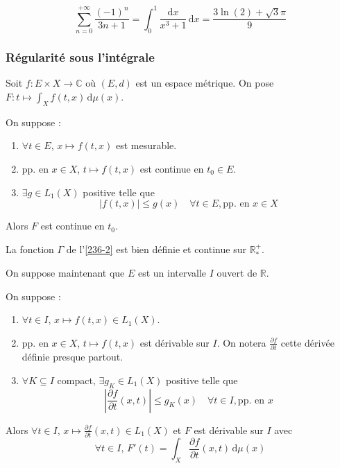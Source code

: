 
  \begin{example}
    \[ \sum_{n=0}^{+\infty} \frac{(-1)^n}{3n+1} = \int_0^1 \frac{\mathrm{d}x}{x^3 + 1} \, \mathrm{d}x = \frac{3\ln(2) + \sqrt{3}\pi}{9} \]
  \end{example}

  \subsubsection{Régularité sous l'intégrale}


  Soit $f : E \times X \rightarrow \mathbb{C}$ où $(E, d)$ est un espace métrique. On pose $F : t \mapsto \int_X f(t, x) \, \mathrm{d}\mu(x)$.

  \begin{theorem}
    On suppose :
    \begin{enumerate}[label=(\roman*)]
      \item $\forall t \in E$, $x \mapsto f(t,x)$ est mesurable.
      \item pp. en $x \in X$, $t \mapsto f(t,x)$ est continue en $t_0 \in E$.
      \item $\exists g \in L_1(X)$ positive telle que
      \[ |f(t,x)| \leq g(x) \quad \forall t \in E, \text{pp. en } x \in X \]
    \end{enumerate}
    Alors $F$ est continue en $t_0$.
  \end{theorem}


  \begin{example}
    La fonction $\Gamma$ de l'\cref{236-2} est bien définie et continue sur $\mathbb{R}^+_*$.
  \end{example}


  On suppose maintenant que $E$ est un intervalle $I$ ouvert de $\mathbb{R}$.

  \begin{theorem}
    On suppose :
    \begin{enumerate}[label=(\roman*)]
      \item $\forall t \in I$, $x \mapsto f(t,x) \in L_1(X)$.
      \item pp. en $x \in X$, $t \mapsto f(t,x)$ est dérivable sur $I$. On notera $\frac{\partial f}{\partial t}$ cette dérivée définie presque partout.
      \item $\forall K \subseteq I$ compact, $\exists g_K \in L_1(X)$ positive telle que
      \[ \left| \frac{\partial f}{\partial t}(x,t) \right| \leq g_K(x) \quad \forall t \in I, \text{pp. en } x \]
    \end{enumerate}
    Alors $\forall t \in I$, $x \mapsto \frac{\partial f}{\partial t}(x, t) \in L_1(X)$ et $F$ est dérivable sur $I$ avec
    \[ \forall t \in I, \, F'(t) = \int_X \frac{\partial f}{\partial t}(x, t) \, \mathrm{d}\mu(x) \]
  \end{theorem}

